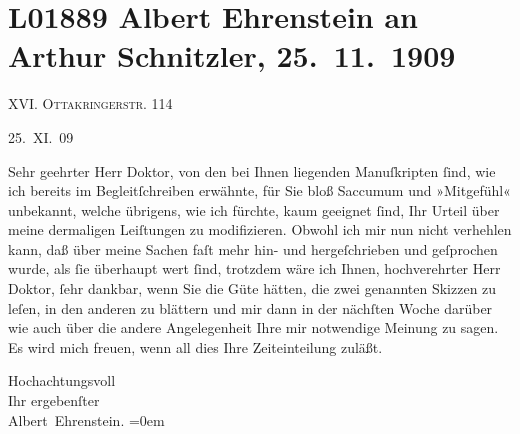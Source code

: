 

\section[Albert Ehrenstein an Arthur Schnitzler, 25. 11. 1909]{L01889 Albert Ehrenstein an Arthur Schnitzler, 25. 11. 1909}
\nopagebreak{}
\rehead{ }\normalsize\beginnumbering{}
\toendnotes[C]{\smallbreak\pagebreak[2]}
\toendnotes[C]{\smallbreak}
\pstart
           
\pstart
           {\pb}XVI. \textsc{Ottakringerstr}.
                        114\pend
           
\pstart
           \raggedleft{}25. XI. 09\pend
           \pend
           
\pstart{}Sehr geehrter Herr Doktor,\pend\vspace{0.5em}
\pstart
           von den bei Ihnen liegenden Manuſkripten ſind, wie ich bereits im Begleitſchreiben
               erwähnte, für Sie bloß Saccumum und »Mitgefühl« unbekannt, welche übrigens, wie ich
               fürchte, kaum geeignet ſind, Ihr Urteil über meine dermaligen Leiſtungen zu
               modifizieren. Obwohl ich mir nun nicht verhehlen kann, daß über meine Sachen faſt
               mehr hin- und hergeſchrieben und geſprochen wurde, als {\pb}ſie überhaupt wert ſind, trotzdem wäre ich
               Ihnen, hochverehrter Herr Doktor, ſehr dankbar, wenn Sie die Güte hätten, die zwei
               genannten Skizzen zu
               leſen, in den anderen zu blättern und mir dann in der nächſten Woche darüber wie auch
               über die andere Angelegenheit Ihre mir notwendige Meinung zu sagen. Es wird mich
               freuen, wenn all dies Ihre Zeiteinteilung zuläßt.\pend
           
\pstart
           Hochachtungsvoll{\\[\baselineskip]}Ihr ergebenſter{\\[\baselineskip]}\spacefill\mbox{Albert Ehrenstein.}\pend
           \leftskip=0em{}\endnumbering{}  
      
